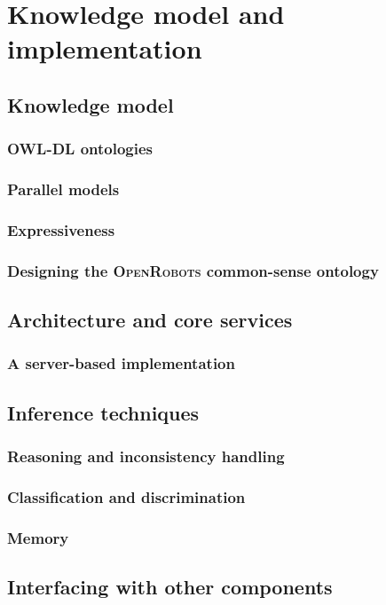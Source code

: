 \chapter{Knowledge model and implementation}
\label{chapter|implementation}

\section{Knowledge model}
\label{sect|knowledge-model}

\subsection{OWL-DL ontologies}
\label{sect|owldl-ontologies}

\subsection{Parallel models}
\label{sect|parallel-models}

\subsection{Expressiveness}
\label{sect|expressiveness}

\subsection{Designing the \textsc{OpenRobots} common-sense ontology}
\label{sect|commonsense-design}

\section{ Architecture and core services}
\label{sect|oro-core}

\subsection{A server-based implementation}
\label{sect|oro-serverbased}

\section{Inference techniques}
\label{sect|inference-techniques}

\subsection{Reasoning and inconsistency handling}
\label{sect|reasoning}


\subsection{Classification and discrimination}
\label{subssect|discrimination}

\subsection{Memory}
\label{subssect|memory}

\section{Interfacing with other components}
\label{sect|interfacing}

